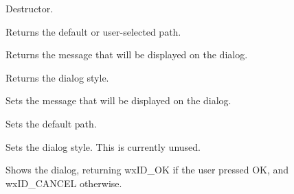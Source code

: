 





Destructor.

\label{wxdirdialoggetpath}


Returns the default or user-selected path.

\label{wxdirdialoggetmessage}


Returns the message that will be displayed on the dialog.

\label{wxdirdialoggetstyle}


Returns the dialog style.

\label{wxdirdialogsetmessage}


Sets the message that will be displayed on the dialog.

\label{wxdirdialogsetpath}


Sets the default path.

\label{wxdirdialogsetstyle}


Sets the dialog style. This is currently unused.

\label{wxdirdialogshowmodal}


Shows the dialog, returning wxID\_OK if the user pressed OK, and wxID\_CANCEL
otherwise.


